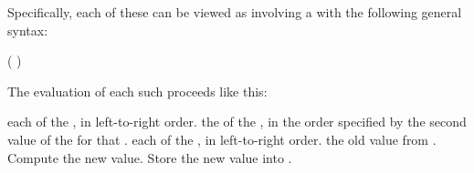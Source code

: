 Specifically, each of these  can be viewed as involving a
 with the following general syntax:

\code
 (   )
\endcode

The evaluation of each such  proceeds like this:

\beginlist
{}  each of the , in left-to-right order.
  the  of the ,
 in the order specified by the second value of the 
 for that .
  each of the , in left-to-right order.
  the old value from .
 Compute the new value.
 Store the new value into .
\endlist



\endsubSection%
